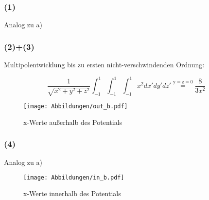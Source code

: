 \subsubsection*{(1)}
Analog zu a)

\subsubsection*{(2)+(3)}
Multipolentwicklung bis zu ersten nicht-verschwindenden Ordnung:

\begin{equation*}
  \frac{1}{\sqrt{x^2+y^2+z^2}} \int_{-1}^1 \int_{-1}^1 \int_{-1}^1 x^2 dx'dy'dz'
  \overset{\mathrm{y=z=0}}{=} \frac{8}{3x^2}
\end{equation*}

\begin{figure}[H]
    \centering
    \texttt{[image: Abbildungen/out\_b.pdf]}
    \caption{x-Werte außerhalb des Potentials}
    \label{fig:2b.2}
\end{figure}

\subsubsection*{(4)}
Analog zu a)

\begin{figure}[H]
    \centering
    \texttt{[image: Abbildungen/in\_b.pdf]}
    \caption{x-Werte innerhalb des Potentials}
    \label{fig:2b.4}
\end{figure}


